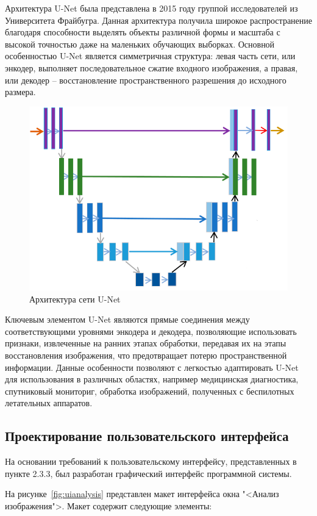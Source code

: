 Архитектура U-Net была представлена в 2015 году группой исследователей из Университета Фрайбугра. Данная архитектура получила широкое распространение благодаря способности выделять объекты различной формы и масштаба с высокой точностью даже на маленьких обучающих выборках. Основной особенностью U-Net является симметричная структура: левая часть сети, или энкодер, выполняет последовательное сжатие входного изображения, а правая, или декодер -- восстановление пространственного разрешения до исходного размера.

\begin{figure}[h]
	\centering
	\includegraphics[width=0.85\linewidth]{images/unet}
	\caption{Архитектура сети U-Net}
	\label{fig:unet}
\end{figure}

Ключевым элементом U-Net являются прямые соединения между соответствующими уровнями энкодера и декодера, позволяющие использовать признаки, извлеченные на ранних этапах обработки, передавая их на этапы восстановления изображения, что предотвращает потерю пространственной информации. Данные особенности позволяют с легкостью адаптировать U-Net для использования в различных областях, например медицинская диагностика, спутниковый мониториг, обработка изображений, полученных с беспилотных летательных аппаратов.

\subsection{Проектирование пользовательского интерфейса}

На основании требований к пользовательскому интерфейсу, представленных в пункте 2.3.3, был разработан графический интерфейс программной системы. 

На рисунке~\ref{fig:uianalysis} представлен макет интерфейса окна "<Анализ изображения">. Макет содержит следующие элементы:

